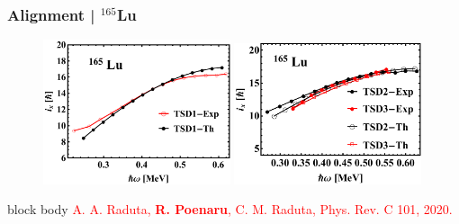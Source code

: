 \documentclass{beamer}
\begin{document}
\begin{frame}
	\frametitle{Alignment | $^{165}$Lu}
	\begin{figure}
		\centering
		\includegraphics[width=0.49\textwidth]{figures/Lu-exp-energies/fig9a_lu165.pdf}
		\includegraphics[width=0.49\textwidth]{figures/Lu-exp-energies/fig9b_lu165.pdf}
	\end{figure}
	\begin{beamercolorbox}[rounded=true,shadow=false, wd=\linewidth,]{block body}
		\centering
		\textcolor{red}{\footnotesize{A. A. Raduta, \textbf{R. Poenaru}, C. M. Raduta, Phys. Rev. C 101, 2020.}}
	\end{beamercolorbox}
\end{frame}
\end{document}
